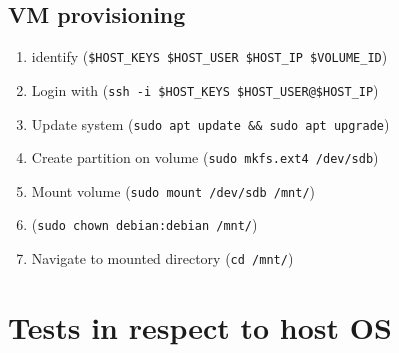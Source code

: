 \documentclass[printmode]{mgr}
\begin{document}
\subsection*{VM provisioning}

\begin{enumerate}
  \item identify (\verb|$HOST_KEYS $HOST_USER $HOST_IP $VOLUME_ID|)
  \item Login with (\verb|ssh -i $HOST_KEYS $HOST_USER@$HOST_IP|)
  \item Update system (\verb|sudo apt update && sudo apt upgrade|)
  \item Create partition on volume (\verb|sudo mkfs.ext4 /dev/sdb|)
  \item Mount volume (\verb|sudo mount /dev/sdb /mnt/|)
  \item (\verb|sudo chown debian:debian /mnt/|)
  \item Navigate to mounted directory (\verb|cd /mnt/|)
\end{enumerate}

\section{Tests in respect to host OS}
\end{document}
